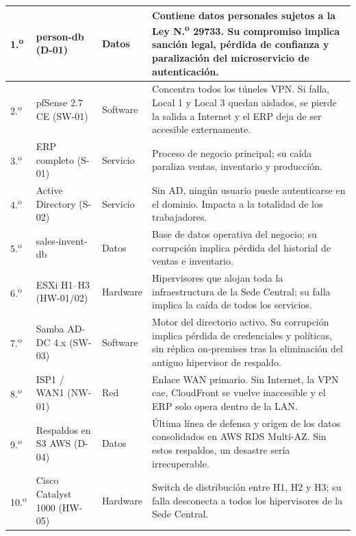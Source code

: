 \documentclass[11pt, a4paper, oneside]{report}
\begin{document}
\begin{xltabular}{\textwidth}{@{}|L{1.4cm}|L{3.2cm}|L{2.2cm}|X|@{}}
{\small 1.\textsuperscript{o}} & {\small person-db (D-01)} & {\small Datos} & {\small Contiene datos personales sujetos a la Ley N.\textsuperscript{o} 29733. Su compromiso implica sanción legal, pérdida de confianza y paralización del microservicio de autenticación.} \\ \hline
{\small 2.\textsuperscript{o}} & {\small pfSense 2.7 CE (SW-01)} & {\small Software} & {\small Concentra todos los túneles VPN. Si falla, Local 1 y Local 3 quedan aislados, se pierde la salida a Internet y el ERP deja de ser accesible externamente.} \\ \hline
{\small 3.\textsuperscript{o}} & {\small ERP completo (S-01)} & {\small Servicio} & {\small Proceso de negocio principal; su caída paraliza ventas, inventario y producción.} \\ \hline
{\small 4.\textsuperscript{o}} & {\small Active Directory (S-02)} & {\small Servicio} & {\small Sin AD, ningún usuario puede autenticarse en el dominio. Impacta a la totalidad de los trabajadores.} \\ \hline
{\small 5.\textsuperscript{o}} & {\small sales-invent-db} & {\small Datos} & {\small Base de datos operativa del negocio; su corrupción implica pérdida del historial de ventas e inventario.} \\ \hline
{\small 6.\textsuperscript{o}} & {\small ESXi H1--H3 (HW-01/02)} & {\small Hardware} & {\small Hipervisores que alojan toda la infraestructura de la Sede Central; su falla implica la caída de todos los servicios.} \\ \hline
{\small 7.\textsuperscript{o}} & {\small Samba AD-DC 4.x (SW-03)} & {\small Software} & {\small Motor del directorio activo. Su corrupción implica pérdida de credenciales y políticas, sin réplica on-premises tras la eliminación del antiguo hipervisor de respaldo.} \\ \hline
{\small 8.\textsuperscript{o}} & {\small ISP1 / WAN1 (NW-01)} & {\small Red} & {\small Enlace WAN primario. Sin Internet, la VPN cae, CloudFront se vuelve inaccesible y el ERP solo opera dentro de la LAN.} \\ \hline
{\small 9.\textsuperscript{o}} & {\small Respaldos en S3 AWS (D-04)} & {\small Datos} & {\small Última línea de defensa y origen de los datos consolidados en AWS RDS Multi-AZ. Sin estos respaldos, un desastre sería irrecuperable.} \\ \hline
{\small 10.\textsuperscript{o}} & {\small Cisco Catalyst 1000 (HW-05)} & {\small Hardware} & {\small Switch de distribución entre H1, H2 y H3; su falla desconecta a todos los hipervisores de la Sede Central.} \\ \hline

\end{xltabular}
\end{document}
